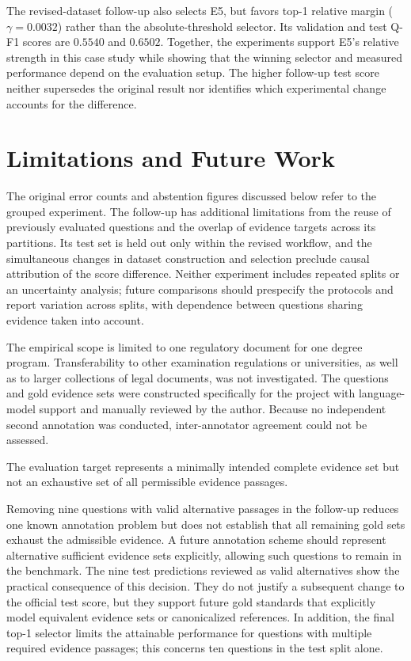 \documentclass[11pt]{article}
\newcommand{\revision}[1]{{\color{blue}#1}}
\begin{document}
\revision{The revised-dataset follow-up also selects E5, but favors top-1 relative margin ($\gamma=0.0032$) rather than the absolute-threshold selector. Its validation and test Q-F1 scores are $0.5540$ and $0.6502$. Together, the experiments support E5's relative strength in this case study while showing that the winning selector and measured performance depend on the evaluation setup. The higher follow-up test score neither supersedes the original result nor identifies which experimental change accounts for the difference.}


\section{Limitations and Future Work}

\revision{The original error counts and abstention figures discussed below refer to the grouped experiment. The follow-up has additional limitations from the reuse of previously evaluated questions and the overlap of evidence targets across its partitions. Its test set is held out only within the revised workflow, and the simultaneous changes in dataset construction and selection preclude causal attribution of the score difference. Neither experiment includes repeated splits or an uncertainty analysis; future comparisons should prespecify the protocols and report variation across splits, with dependence between questions sharing evidence taken into account.}

The empirical scope is limited to one regulatory document for one degree program. Transferability to other examination regulations or universities, as well as to larger collections of legal documents, was not investigated. The questions and gold evidence sets were constructed specifically for the project with language-model support and manually reviewed by the author. Because no independent second annotation was conducted, inter-annotator agreement could not be assessed.

The evaluation target represents a minimally intended complete evidence set but not an exhaustive set of all permissible evidence passages.

\revision{Removing nine questions with valid alternative passages in the follow-up reduces one known annotation problem but does not establish that all remaining gold sets exhaust the admissible evidence. A future annotation scheme should represent alternative sufficient evidence sets explicitly, allowing such questions to remain in the benchmark.} The nine test predictions reviewed as valid alternatives show the practical consequence of this decision. They do not justify a subsequent change to the official test score, but they support future gold standards that explicitly model equivalent evidence sets or canonicalized references. In addition, the final top-1 selector limits the attainable performance for questions with multiple required evidence passages; this concerns ten questions in the test split alone.
\end{document}
